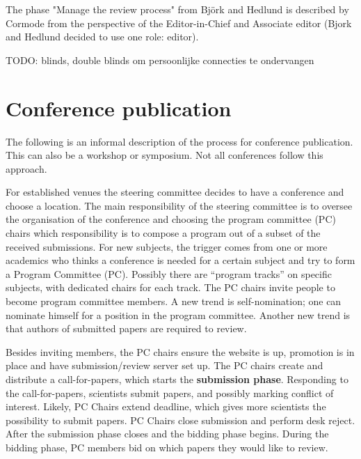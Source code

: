 \documentclass{ou-report}
\newcommand{\todo}[1]{{\color{red} TODO: #1}}
\newcommand{\outline}[1]{{\color{blue} #1}}
\begin{document}
The phase "Manage the review process" from Bj\"ork and Hedlund is described by Cormode from the perspective of the Editor-in-Chief and Associate editor (Bjork and Hedlund decided to use one role: editor). 



\todo{blinds, double blinds om persoonlijke connecties te ondervangen}

\section{Conference publication}
\outline{
The following is an informal description of the process for conference 
publication. This can also be a workshop or symposium. Not all conferences 
follow this approach.

For established venues the steering committee decides to have a conference and 
choose a location. The main responsibility of the steering committee is to 
oversee the organisation of the conference and choosing the program 
committee (PC) chairs which responsibility is to compose a program out of a 
subset of the received 
submissions. For new subjects, the trigger comes from one or more 
academics who thinks a conference is needed for a certain subject and try to 
form a Program Committee (PC). Possibly there are ``program tracks'' on specific 
subjects, with dedicated chairs for each track.
The PC chairs invite people to become program 
committee members. A new trend is self-nomination; one can nominate himself for 
a position in the program committee. Another new trend is that authors of 
submitted papers are required to review.

Besides inviting members, the PC chairs ensure the website is up, promotion 
is in place and have submission/review server set up.
The PC chairs create and distribute a call-for-papers, which starts the 
\textbf{submission phase}.
Responding to the call-for-papers, scientists submit papers, and possibly 
marking conflict of interest. Likely, PC Chairs extend deadline, which gives 
more scientists the possibility to submit papers. PC Chairs close submission and 
perform desk reject.
After the submission phase closes and the bidding phase begins. During the 
bidding phase, PC members bid on which papers they would like to review.

}
\end{document}
